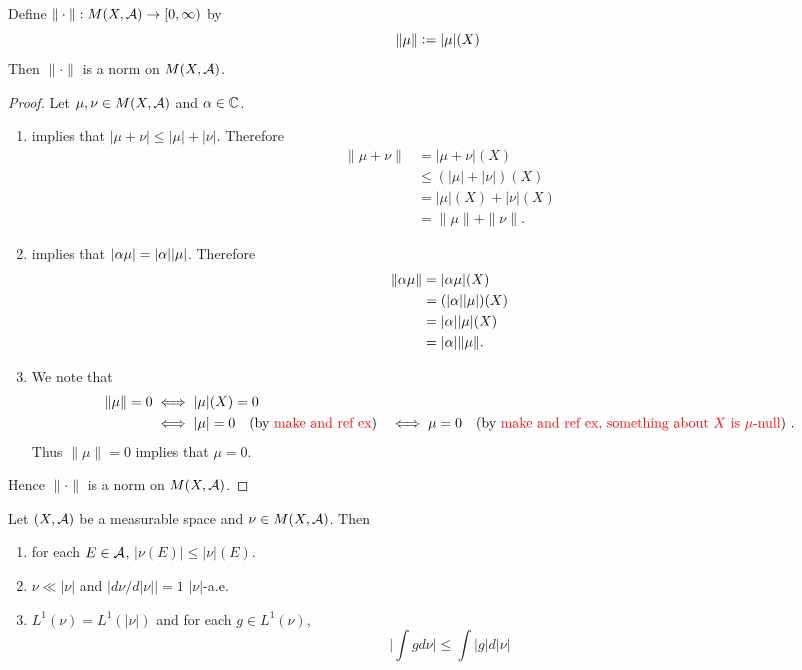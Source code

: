\documentclass{book}
\begin{document}
	\begin{ex}  
	Define $\|\cdot \|: M(X, \mathcal{A}) \rightarrow [0,\infty)$ by 
	$$\|\mu \| \vcentcolon= | \mu | (X)$$ 
	Then $\|\cdot \|$ is a norm on $M(X, \mathcal{A})$. 
	\end{ex}
	
	\begin{proof}
		Let $\mu, \nu \in M(X, \mathcal{A})$ and $\alpha \in \mathbb{C}$.
		\begin{enumerate}
			\item {} implies that $| \mu + \nu | \leq | \mu | + | \nu |$. Therefore 
			\begin{align*}
				\| \mu + \nu \| 
				& = | \mu + \nu |(X) \\
				& \leq (| \mu | + | \nu |)(X) \\
				& = | \mu |(X) + | \nu |(X) \\
				& = \| \mu  \|  + \| \nu \|.
			\end{align*}
			\item {} implies that $|\alpha \mu| = |\alpha| |\mu|$. Therefore
			\begin{align*}
				\|\alpha \mu\|
				& = |\alpha \mu|(X) \\
				& = (|\alpha| |\mu|)(X) \\
				& = |\alpha| |\mu|(X) \\
				& = |\alpha| \|\mu\|.
			\end{align*}
			\item We note that
			\begin{align*}
				\|\mu\| = 0
				& \iff |\mu|(X) = 0 \\
				& \iff |\mu| = 0  \quad \text{(by \textcolor{red}{make and ref ex})}
				& \iff \mu = 0  \quad \text{(by \textcolor{red}{make and ref ex, something about $X$ is $\mu$-null}) }. 
			\end{align*}
			Thus $\|\mu\| = 0$ implies that $\mu = 0$. 
		\end{enumerate}
		Hence $\|\cdot\|$ is a norm on $M(X, \mathcal{A})$.
	\end{proof}
	
	\begin{ex}  
		Let $(X, \mathcal{A})$ be a measurable space and $\nu \in M(X, \mathcal{A})$. Then 
		\begin{enumerate}
			\item for each $E \in \mathcal{A}$, $|\nu(E)| \leq |\nu|(E)$. 
			\item $\nu \ll |\nu|$ and $\big|d \nu /d |\nu|\big| = 1$ $|\nu|$-a.e.
			\item $L^1(\nu) = L^1(|\nu|)$ and for each $g \in L^1(\nu)$, 
			$$ \bigg|\int g d\nu \bigg| \leq \int |g|d |\nu|$$
		\end{enumerate}
	\end{ex}
	
\end{document}
